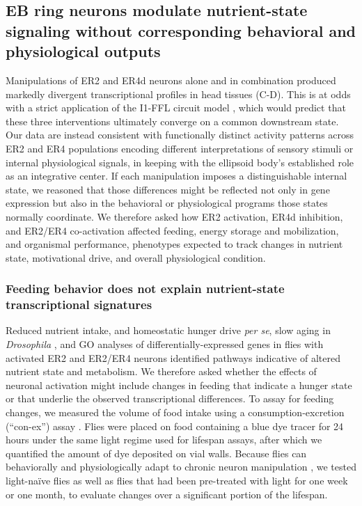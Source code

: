 \subsection*{EB ring neurons modulate nutrient-state signaling without corresponding behavioral and physiological outputs}
Manipulations of ER2 and ER4d neurons alone and in combination produced markedly divergent transcriptional profiles in head tissues (C-D). 
This is at odds with a strict application of the I1-FFL circuit model \citep{ishimoto2020}, which would predict that these three interventions ultimately converge on a common downstream state. Our data are instead consistent with functionally distinct activity patterns across ER2 and ER4 populations encoding different interpretations of sensory stimuli or internal physiological signals, in keeping with the ellipsoid body's established role as an integrative center. 
If each manipulation imposes a distinguishable internal state, we reasoned that those differences might be reflected not only in gene expression but also in the behavioral or physiological programs those states normally coordinate.
We therefore asked how ER2 activation, ER4d inhibition, and ER2/ER4 co-activation affected feeding, energy storage and mobilization, and organismal performance, phenotypes expected to track changes in nutrient state, motivational drive, and overall physiological condition.

\subsubsection*{Feeding behavior does not explain nutrient-state transcriptional signatures}

Reduced nutrient intake, and homeostatic hunger drive \textit{per se}, slow aging in \textit{Drosophila} \citep{pletcher2002,weaver2023a}, and GO analyses of differentially-expressed genes in flies with activated ER2 and ER2/ER4 neurons identified pathways indicative of altered nutrient state and metabolism. 
We therefore asked whether the effects of neuronal activation might include changes in feeding that indicate a hunger state or that underlie the observed transcriptional differences. 
To assay for feeding changes, we measured the volume of food intake using a consumption-excretion (“con-ex”) assay \citep{shell2018}. 
Flies were placed on food containing a blue dye tracer for 24 hours under the same light regime used for lifespan assays, after which we quantified the amount of dye deposited on vial walls.  
Because flies can behaviorally and physiologically adapt to chronic neuron manipulation \citep{weaver2023a}, we tested light-naïve flies as well as flies that had been pre-treated with light for one week or one month, to evaluate changes over a significant portion of the lifespan. 

